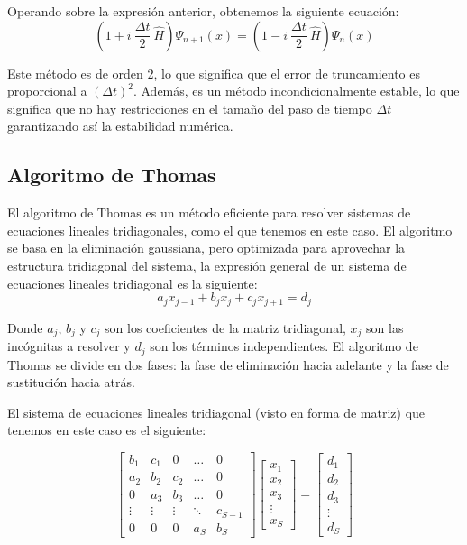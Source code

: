 \documentclass[10pt,onecolumn]{article}
\begin{document}
Operando sobre la expresión anterior, obtenemos la siguiente ecuación:
\begin{equation}
    (1 + i\ \dfrac{\Delta t}{2}\ \hat{H})\Psi_{n+1}(x) = (1 - i\ \dfrac{\Delta t}{2}\ \hat{H})\Psi_n(x)
\end{equation}

Este método es de orden 2, lo que significa que el error de truncamiento es proporcional a $(\Delta t)^2$. Además, es un método incondicionalmente estable, lo que significa que no hay restricciones en el tamaño del paso de tiempo $\Delta t$  garantizando así la estabilidad numérica.

\subsection{Algoritmo de Thomas}

El algoritmo de Thomas es un método eficiente para resolver sistemas de ecuaciones lineales tridiagonales, como el que tenemos en este caso. El algoritmo se basa en la eliminación gaussiana, pero optimizada para aprovechar la estructura tridiagonal del sistema, la expresión general de un sistema de ecuaciones lineales tridiagonal es la siguiente:
\begin{equation}
    a_j x_{j-1} + b_j x_j + c_j x_{j+1} = d_j
\end{equation}

Donde $a_j$, $b_j$ y $c_j$ son los coeficientes de la matriz tridiagonal, $x_j$ son las incógnitas a resolver y $d_j$ son los términos independientes. El algoritmo de Thomas se divide en dos fases: la fase de eliminación hacia adelante y la fase de sustitución hacia atrás.

El sistema de ecuaciones lineales tridiagonal (visto en forma de matriz) que tenemos en este caso es el siguiente:

\begin{equation}
    \begin{bmatrix}
    b_1 & c_1 & 0 & \ldots & 0 \\
    a_2 & b_2 & c_2 & \ldots & 0 \\
    0 & a_3 & b_3 & \ldots & 0 \\
    \vdots & \vdots & \vdots & \ddots & c_{S-1} \\
    0 & 0 & 0 & a_S & b_S
    \end{bmatrix}
    \begin{bmatrix}
    x_1 \\
    x_2 \\
    x_3 \\
    \vdots \\
    x_S
    \end{bmatrix}
    =
    \begin{bmatrix}
    d_1 \\
    d_2 \\
    d_3 \\
    \vdots \\
    d_S
    \end{bmatrix}
\end{equation}
\end{document}

